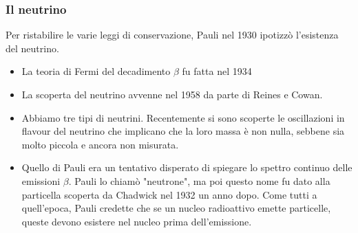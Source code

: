\subsubsection{Il neutrino}
Per ristabilire le varie leggi di conservazione, Pauli nel 1930 ipotizzò l'esistenza del neutrino. 
\begin{itemize}
    \item La teoria di Fermi del decadimento $\beta$ fu fatta nel 1934
    \item La scoperta del neutrino avvenne nel 1958 da parte di Reines e Cowan.
    \item Abbiamo tre tipi di neutrini. Recentemente si sono scoperte le oscillazioni in flavour del neutrino che implicano che la loro massa è non nulla, sebbene sia molto piccola e ancora non misurata.
    \item Quello di Pauli era un tentativo disperato di spiegare lo spettro continuo delle emissioni $\beta$. Pauli lo chiamò "neutrone", ma poi questo nome fu dato alla particella scoperta da Chadwick nel 1932 un anno dopo. Come tutti a quell'epoca, Pauli credette che se un nucleo radioattivo emette particelle, queste devono esistere nel nucleo prima dell'emissione.
\end{itemize}
